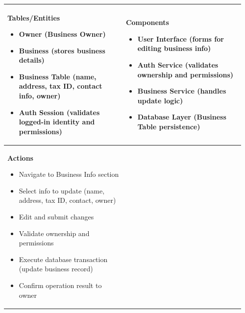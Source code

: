 \documentclass[]{VUMIFTemplateClass}
\newenvironment{mpitemlist}[1][\linewidth]{%
    \begin{minipage}[t]{#1}%
        \setlength{\leftmargini}{12pt}%
        \begin{itemize}%
            \setlength{\itemsep}{1pt}%
            \setlength{\parskip}{0pt}%
            \setlength{\parsep}{0pt}%
}{%
        \end{itemize}%
    \end{minipage}\newline
}
\begin{document}
\begin{center}
\setlength{\tabcolsep}{8pt}
\begin{tabular}{|p{0.48\linewidth}|p{0.48\linewidth}|}
\hline
\textbf{Tables/Entities} \newline
\begin{mpitemlist}
\item Owner (Business Owner)
\item Business (stores business details)
\item Business Table (name, address, tax ID, contact info, owner)
\item Auth Session (validates logged-in identity and permissions)
\end{mpitemlist}
&
\textbf{Components} \newline
\begin{mpitemlist}
\item User Interface (forms for editing business info)
\item Auth Service (validates ownership and permissions)
\item Business Service (handles update logic)
\item Database Layer (Business Table persistence)
\end{mpitemlist}
\\ \hline
\textbf{Actions} \newline
\begin{mpitemlist}
\item Navigate to Business Info section
\item Select info to update (name, address, tax ID, contact, owner)
\item Edit and submit changes
\item Validate ownership and permissions
\item Execute database transaction (update business record)
\item Confirm operation result to owner
\end{mpitemlist}
&

\\ \hline
\end{tabular}
\end{center}
\end{document}
